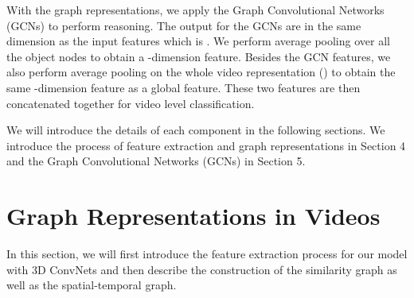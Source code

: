 \documentclass[runningheads]{llncs}
\begin{document}
With the graph representations, we apply the Graph Convolutional Networks (GCNs) to perform reasoning. The output for the GCNs are in the same dimension as the input features which is . We perform average pooling over all the  object nodes to obtain a -dimension feature. Besides the GCN features, we also perform average pooling on the whole video representation () to obtain the same -dimension feature as a global feature. These two features are then concatenated together for video level classification.   

We will introduce the details of each component in the following sections. We introduce the process of feature extraction and graph representations in Section 4 and the Graph Convolutional Networks (GCNs) in Section 5. 



\vspace{-0.1in}
\section{Graph Representations in Videos}
\vspace{-0.1in}

In this section, we will first introduce the feature extraction process for our model with 3D ConvNets and then describe the construction of the similarity graph as well as the spatial-temporal graph.
\end{document}
